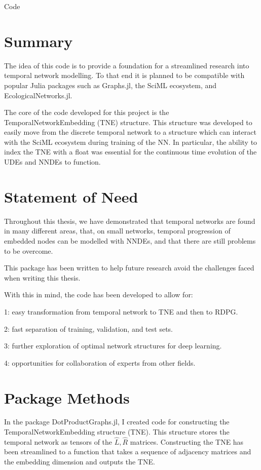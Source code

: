 \documentclass[12pt]{amsbook}
\begin{document}
\begin{chapter}{Code}
    \section{Summary}
        The idea of this code is to provide a foundation for a streamlined research into temporal network modelling. To that end it is planned to be compatible with popular Julia packages such as Graphs.jl, the SciML ecosystem, and EcologicalNetworks.jl.

        The core of the code developed for this project is the TemporalNetworkEmbedding (TNE) structure. This structure was developed to easily move from the discrete temporal network to a structure which can interact with the SciML ecosystem during training of the NN. In particular, the ability to index the TNE with a float was essential for the continuous time evolution of the UDEs and NNDEs to function.

    \section{Statement of Need}
        Throughout this thesis, we have demonstrated that temporal networks are found in many different areas, that, on small networks, temporal progression of embedded nodes can be modelled with NNDEs, and that there are still problems to be overcome. 

        This package has been written to help future research avoid the challenges faced when writing this thesis.  

        With this in mind, the code has been developed to allow for:

            1: easy transformation from temporal network to TNE and then to RDPG.

            2: fast separation of training, validation, and test sets. 

            3: further exploration of optimal network structures for deep learning.

            4: opportunities for collaboration of experts from other fields.

    \section{Package Methods}
        In the package DotProductGraphs.jl\cite{DotProductGraphs}, I created code for constructing the TemporalNetworkEmbedding structure (TNE). This structure stores the temporal network as tensors of the $\hat L, \hat R$ matrices. Constructing the TNE has been streamlined to a function that takes a sequence of adjacency matrices and the embedding dimension and outputs the TNE. 


\end{chapter}
\end{document}

